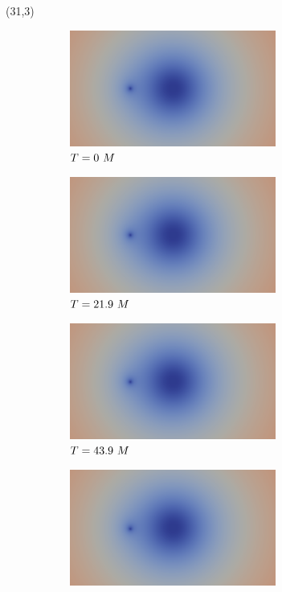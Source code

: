 \documentclass[landscape]{a0poster}
\begin{document}
\begin{textblock}{62}
\begin{textblock}{38}(31,3)
	\begin{figure}
	\begin{subfigure}{0.0714\textwidth}
		\centering
		\includegraphics[height=1.5in]{figs/AE/r100/img_slice_000000.png}
		\caption{\small ${T}=0~M$}
	\end{subfigure}
	\begin{subfigure}{0.0714\textwidth}
		\centering
		\includegraphics[height=1.5in]{figs/AE/r100/img_slice_000020.png}
		\caption{\small ${T}=21.9~M$}
	\end{subfigure}
	\begin{subfigure}{0.0714\textwidth}
		\centering
		\includegraphics[height=1.5in]{figs/AE/r100/img_slice_000040.png}
		\caption{\small ${T}=43.9~M$}
	\end{subfigure}
	\begin{subfigure}{0.0714\textwidth}
		\centering
		\includegraphics[height=1.5in]{figs/AE/r100/img_slice_000060.png}

\end{subfigure}
\end{figure}
\end{textblock}
\end{textblock}
\end{document}
